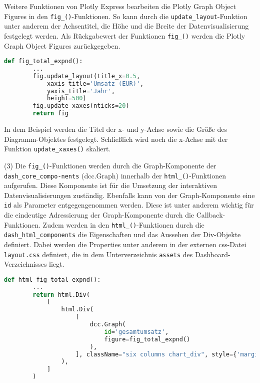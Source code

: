     Weitere Funktionen von Plotly Express bearbeiten die Plotly Graph Object Figures in den \texttt{fig\_()}-Funktionen. 
    So kann durch die \texttt{update\_layout}-Funktion unter anderem der Achsentitel, die Höhe und die Breite der Datenvisualisierung 
    festgelegt werden. Als Rückgabewert der Funktionen \texttt{fig\_()} werden die Plotly Graph Object Figures zurückgegeben.

    \begin{lstlisting}[language=Python, caption=Teilsystem 3 Darstellung - fig\_total\_expnd() Auszug 2]  
    def fig_total_expnd():
        ...
        fig.update_layout(title_x=0.5,
            xaxis_title='Umsatz (EUR)',
            yaxis_title='Jahr',
            height=500)
        fig.update_xaxes(nticks=20)         
        return fig
    \end{lstlisting}

    In dem Beispiel werden die Titel der x- und y-Achse sowie die
    Größe des Diagramm-Objektes festgelegt. Schließlich wird noch die x-Achse mit der Funktion \texttt{update\_xaxes()} skaliert.
    
    (3) Die \texttt{fig\_()}-Funktionen werden durch die Graph-Komponente der \texttt{dash\_core\_compo-nents} (dcc.Graph) innerhalb der 
    \texttt{html\_()}-Funktionen aufgerufen. Diese Komponente ist für die Umsetzung der interaktiven Datenvisualisierungen 
    zuständig. Ebenfalls kann von der Graph-Komponente eine \texttt{id} als Parameter entgegengenommen werden. 
    Diese ist unter anderem wichtig für die eindeutige Adressierung der Graph-Komponente durch die Callback-Funktionen.
    Zudem werden in den \texttt{html\_()}-Funktionen durch die \texttt{dash\_html\_components} die Eigenschaften und 
    das Aussehen der Div-Objekte definiert. 
    Dabei werden die Properties unter anderem in der externen css-Datei \texttt{layout.css} definiert, die in dem Unterverzeichnis \texttt{assets} 
    des Dashboard-Verzeichnisses liegt.

    \begin{lstlisting}[language=Python, caption=Teilsystem 3 Darstellung - html\_fig\_total\_expnd()] 
        def html_fig_total_expnd():
        ...
        return html.Div(
            [
                html.Div(
                    [
                        dcc.Graph(
                            id='gesamtumsatz',
                            figure=fig_total_expnd()
                        ),
                    ], className="six columns chart_div", style={'margin-top': '20px', 'margin-left': '10px'}
                ),
            ]
        )
        \end{lstlisting}
    

